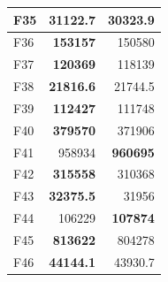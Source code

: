 \begin{table}[]
\begin{tabular}{l|r|r|}
\multicolumn{1}{|l|}{\cellcolor[HTML]{FCE6AB}F35}  & \cellcolor[HTML]{D3FFB6}\textbf{31122.7}                 & 30323.9                                                   \\ \hline
\multicolumn{1}{|l|}{\cellcolor[HTML]{FCE6AB}F36}  & \cellcolor[HTML]{D3FFB6}\textbf{153157}                  & 150580                                                    \\ \hline
\multicolumn{1}{|l|}{\cellcolor[HTML]{FCE6AB}F37}  & \cellcolor[HTML]{D3FFB6}\textbf{120369}                  & 118139                                                    \\ \hline
\multicolumn{1}{|l|}{\cellcolor[HTML]{FCE6AB}F38}  & \cellcolor[HTML]{D3FFB6}\textbf{21816.6}                 & 21744.5                                                   \\ \hline
\multicolumn{1}{|l|}{\cellcolor[HTML]{FCE6AB}F39}  & \cellcolor[HTML]{D3FFB6}\textbf{112427}                  & 111748                                                    \\ \hline
\multicolumn{1}{|l|}{\cellcolor[HTML]{FCE6AB}F40}  & \cellcolor[HTML]{D3FFB6}\textbf{379570}                  & 371906                                                    \\ \hline
\multicolumn{1}{|l|}{\cellcolor[HTML]{FCE6AB}F41}  & 958934                                                   & \cellcolor[HTML]{D3FFB6}\textbf{960695}                   \\ \hline
\multicolumn{1}{|l|}{\cellcolor[HTML]{FCE6AB}F42}  & \cellcolor[HTML]{D3FFB6}\textbf{315558}                  & 310368                                                    \\ \hline
\multicolumn{1}{|l|}{\cellcolor[HTML]{FCE6AB}F43}  & \cellcolor[HTML]{D3FFB6}\textbf{32375.5}                 & 31956                                                     \\ \hline
\multicolumn{1}{|l|}{\cellcolor[HTML]{FCE6AB}F44}  & 106229                                                   & \cellcolor[HTML]{D3FFB6}\textbf{107874}                   \\ \hline
\multicolumn{1}{|l|}{\cellcolor[HTML]{FCE6AB}F45}  & \cellcolor[HTML]{D3FFB6}\textbf{813622}                  & 804278                                                    \\ \hline
\multicolumn{1}{|l|}{\cellcolor[HTML]{FCE6AB}F46}  & \cellcolor[HTML]{D3FFB6}\textbf{44144.1}                 & 43930.7                                                   \\ \hline

\end{tabular}
\end{table}
